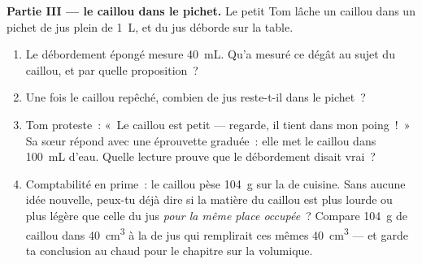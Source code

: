 \begin{problem}
\medskip\noindent\textbf{Partie III --- le caillou dans le pichet.}
Le petit Tom lâche un caillou dans un pichet de jus plein de
\qty{1}{L}, et du jus déborde sur la table.
\begin{enumerate}[resume]
  \item Le débordement épongé mesure \qty{40}{mL}. Qu'a mesuré ce
        dégât au sujet du caillou, et par quelle proposition~?
  \item Une fois le caillou repêché, combien de jus reste-t-il dans
        le pichet~?
  \item Tom proteste~: «~Le caillou est petit --- regarde, il tient
        dans mon poing~!~» Sa sœur répond avec une éprouvette
        graduée~: elle met le caillou dans \qty{100}{mL} d'eau.
        Quelle lecture prouve que le débordement disait vrai~?
  \item Comptabilité en prime~: le caillou pèse \qty{104}{g} sur la
         de cuisine. Sans aucune idée nouvelle, peux-tu déjà
        dire si la matière du caillou est plus lourde ou plus
        légère que celle du jus \emph{pour la même place occupée}~?
        Compare \qty{104}{g} de caillou dans \qty{40}{cm^3} à la
         de jus qui remplirait ces mêmes \qty{40}{cm^3} --- et
        garde ta conclusion au chaud pour le chapitre sur la 
        volumique.
\end{enumerate}
\end{problem}
